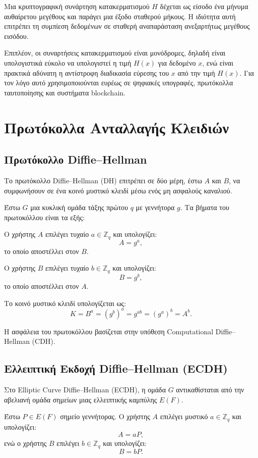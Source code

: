 \documentclass[12pt,a4paper]{report}
\begin{document}
Μια κρυπτογραφική συνάρτηση κατακερματισμού $H$ δέχεται ως είσοδο ένα μήνυμα αυθαίρετου μεγέθους και παράγει μια έξοδο σταθερού μήκους. Η ιδιότητα αυτή επιτρέπει τη συμπίεση δεδομένων σε σταθερή αναπαράσταση ανεξαρτήτως μεγέθους εισόδου.

Επιπλέον, οι συναρτήσεις κατακερματισμού είναι μονόδρομες, δηλαδή είναι υπολογιστικά εύκολο να υπολογιστεί η τιμή $H(x)$ για δεδομένο $x$, ενώ είναι πρακτικά αδύνατη η αντίστροφη διαδικασία εύρεσης του $x$ από την τιμή $H(x)$. Για τον λόγο αυτό χρησιμοποιούνται ευρέως σε ψηφιακές υπογραφές, πρωτόκολλα ταυτοποίησης και συστήματα blockchain.

\section{Πρωτόκολλα Ανταλλαγής Κλειδιών}

\subsection{Πρωτόκολλο Diffie--Hellman}

Το πρωτόκολλο Diffie--Hellman (DH) επιτρέπει σε δύο μέρη, έστω $A$ και $B$, να συμφωνήσουν σε ένα κοινό μυστικό κλειδί μέσω ενός μη ασφαλούς καναλιού.

Έστω $G$ μια κυκλική ομάδα τάξης πρώτου $q$ με γεννήτορα $g$. 
Τα βήματα του πρωτοκόλλου είναι τα εξής:

Ο χρήστης $A$ επιλέγει τυχαίο $a \in \mathbb{Z}_q$ και υπολογίζει:
\[
A = g^a,
\]
το οποίο αποστέλλει στον $B$.

Ο χρήστης $B$ επιλέγει τυχαίο $b \in \mathbb{Z}_q$ και υπολογίζει:
\[
B = g^b,
\]
το οποίο αποστέλλει στον $A$.

Το κοινό μυστικό κλειδί υπολογίζεται ως:
\[
K = B^a = (g^b)^a = g^{ab} = (g^a)^b = A^b.
\]

Η ασφάλεια του πρωτοκόλλου βασίζεται στην υπόθεση Computational Diffie--Hellman (CDH).

\subsection{Ελλειπτική Εκδοχή Diffie--Hellman (ECDH)}

Στο Elliptic Curve Diffie--Hellman (ECDH), η ομάδα $G$ αντικαθίσταται από την αβελιανή ομάδα σημείων μιας ελλειπτικής καμπύλης $E(F)$.

Έστω $P \in E(F)$ σημείο γεννήτορας. Ο χρήστης $A$ επιλέγει μυστικό $a \in \mathbb{Z}_q$ και υπολογίζει:
\[
A = aP,
\]
ενώ ο χρήστης $B$ επιλέγει $b \in \mathbb{Z}_q$ και υπολογίζει:
\[
B = bP.
\]
\end{document}
